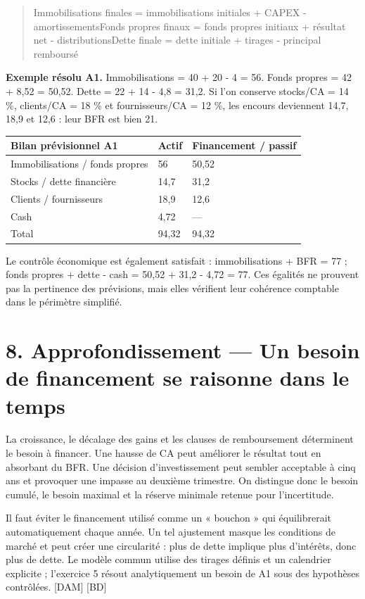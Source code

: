 \documentclass[12pt,a4paper]{article}
\begin{document}
\begin{quote}\small Immobilisations finales = immobilisations initiales + CAPEX - amortissements\newline Fonds propres finaux = fonds propres initiaux + résultat net - distributions\newline Dette finale = dette initiale + tirages - principal remboursé\end{quote}

\textbf{Exemple résolu A1.} Immobilisations = 40 + 20 - 4 = 56. Fonds propres = 42 + 8,52 = 50,52. Dette = 22 + 14 - 4,8 = 31,2. Si l’on conserve stocks/CA = 14 \%, clients/CA = 18 \% et fournisseurs/CA = 12 \%, les encours deviennent 14,7, 18,9 et 12,6 : leur BFR est bien 21.



\Needspace{250pt}
\begin{longtable}{p{5.07cm}p{5.07cm}p{5.07cm}}
\toprule
Bilan prévisionnel A1 & Actif & Financement / passif \\
\midrule\endhead
Immobilisations / fonds propres & 56 & 50,52 \\
Stocks / dette financière & 14,7 & 31,2 \\
Clients / fournisseurs & 18,9 & 12,6 \\
Cash & 4,72 & --- \\
Total & 94,32 & 94,32 \\
\bottomrule
\end{longtable}

Le contrôle économique est également satisfait : immobilisations + BFR = 77 ; fonds propres + dette - cash = 50,52 + 31,2 - 4,72 = 77. Ces égalités ne prouvent pas la pertinence des prévisions, mais elles vérifient leur cohérence comptable dans le périmètre simplifié.

\section*{8. Approfondissement --- Un besoin de financement se raisonne dans le temps}
La croissance, le décalage des gains et les clauses de remboursement déterminent le besoin à financer. Une hausse de CA peut améliorer le résultat tout en absorbant du BFR. Une décision d’investissement peut sembler acceptable à cinq ans et provoquer une impasse au deuxième trimestre. On distingue donc le besoin cumulé, le besoin maximal et la réserve minimale retenue pour l’incertitude.


Il faut éviter le financement utilisé comme un « bouchon » qui équilibrerait automatiquement chaque année. Un tel ajustement masque les conditions de marché et peut créer une circularité : plus de dette implique plus d’intérêts, donc plus de dette. Le modèle commun utilise des tirages définis et un calendrier explicite ; l’exercice 5 résout analytiquement un besoin de A1 sous des hypothèses contrôlées. [DAM] [BD]
\end{document}
